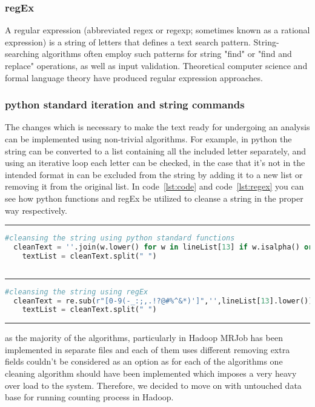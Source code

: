 \subsubsection{regEx} A regular expression (abbreviated regex or regexp; sometimes known as a rational expression) is a string of letters that defines a text search pattern. String-searching algorithms often employ such patterns for string "find" or "find and replace" operations, as well as input validation. Theoretical computer science and formal language theory have produced regular expression approaches\cite{statista}.
\subsubsection{python standard iteration and string commands}
The changes which is necessary to make the text ready for undergoing an analysis can be implemented using non-trivial algorithms. For example, in python the string can be converted to a list containing all the included letter separately, and using an iterative loop each letter can be checked, in the case that it's not in the intended format in can be excluded from the string by adding it to a new list or removing it from the original list. In code~\ref{lst:code} and code~\ref{lst:regex} you can see how python functions and regEx be utilized to cleanse a string in the proper way respectively.


\rule{200 pt}{0.5 pt} 
\renewcommand{\lstlistingname}{Code}
\lstset{style=mystyle}
\begin{lstlisting}[language=Python, caption={String cleansing using python standard functions}, label={lst:code}, mathescape = true, breaklines=true]
  #cleansing the string using python standard functions
  cleanText = ''.join(w.lower() for w in lineList[13] if w.isalpha() or w == " ")
    textList = cleanText.split(" ")
    
\end{lstlisting}

\rule{200 pt}{0.5 pt} 

\lstset{style=mystyle}
\begin{lstlisting}[language=Python, caption={String cleansing using regEx}, label={lst:regex}, mathescape = true, breaklines=true]
  #cleansing the string using regEx
  cleanText = re.sub(r"[0-9(-_:;,.!?@#%^&*)']",'',lineList[13].lower())
    textList = cleanText.split(" ")
\end{lstlisting}

\rule{200 pt}{0.5 pt} 


as the majority of the algorithms, particularly in Hadoop MRJob has been implemented in separate files and each of them uses different removing extra fields couldn't be considered as an option as for each of the algorithms one cleaning algorithm should have been implemented which imposes a very heavy over load to the system. Therefore, we decided to move on with untouched data base for running counting process in Hadoop.